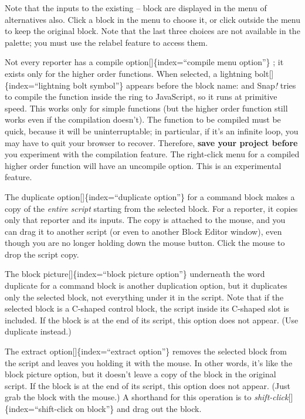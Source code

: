 \documentclass[
  letterpaper,
]{book}
\begin{document}
Note that the inputs to the existing -- block are displayed in the menu
of alternatives also. Click a block in the menu to choose it, or click
outside the menu to keep the original block. Note that the last three
choices are not available in the palette; you must use the relabel
feature to access them.

Not every reporter has a compile option{[}{]}\{index=``compile menu
option''\} ; it exists only for the higher order functions. When
selected, a lightning bolt{[}{]}\{index=``lightning bolt symbol''\}
appears before the block name: and Snap\emph{!} tries to compile the
function inside the ring to JavaScript, so it runs at primitive speed.
This works only for simple functions (but the higher order function
still works even if the compilation doesn't). The function to be
compiled must be quick, because it will be uninterruptable; in
particular, if it's an infinite loop, you may have to quit your browser
to recover. Therefore, \textbf{save your project before} you experiment
with the compilation feature. The right-click menu for a compiled higher
order function will have an uncompile option. This is an experimental
feature.

The duplicate option{[}{]}\{index=``duplicate option''\} for a command
block makes a copy of the \emph{entire script} starting from the
selected block. For a reporter, it copies only that reporter and its
inputs. The copy is attached to the mouse, and you can drag it to
another script (or even to another Block Editor window), even though you
are no longer holding down the mouse button. Click the mouse to drop the
script copy.

The block picture{[}{]}\{index=``block picture option''\} underneath the
word duplicate for a command block is another duplication option, but it
duplicates only the selected block, not everything under it in the
script. Note that if the selected block is a C-shaped control block, the
script inside its C-shaped slot is included. If the block is at the end
of its script, this option does not appear. (Use duplicate instead.)

The extract option{[}{]}\{index=``extract option''\} removes the
selected block from the script and leaves you holding it with the mouse.
In other words, it's like the block picture option, but it doesn't leave
a copy of the block in the original script. If the block is at the end
of its script, this option does not appear. (Just grab the block with
the mouse.) A shorthand for this operation is to
\emph{shift-click}{[}{]}\{index=``shift-click on block''\} and drag out
the block.
\end{document}

